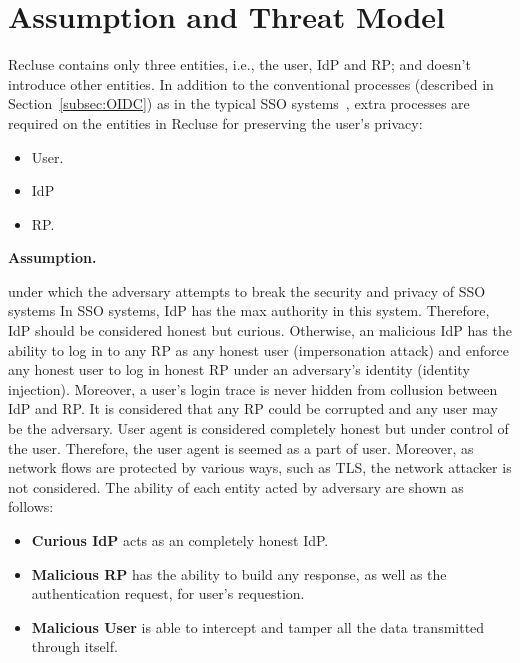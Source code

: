 \section{Assumption and Threat Model}
\label{sec:assumptionandthreatmodel}
Recluse contains only three entities, i.e., the user, IdP and RP; and doesn't introduce other entities. In addition to the conventional processes (described in Section~\ref{subsec:OIDC}) as in the typical SSO systems~\cite{SAMLIdentifier,OpenIDConnect}, extra processes are required on the entities in Recluse for preserving the user's privacy:
\begin{itemize}
  \item User.
  \item IdP
  \item RP. 
\end{itemize}

\noindent\textbf{Assumption.}

under which the adversary attempts to break the security and privacy of SSO systems
In SSO systems, IdP has the max authority in this system. Therefore, IdP should be considered honest but curious. Otherwise, an malicious IdP has the ability to log in to any RP as any honest user (impersonation attack) and enforce any honest user to log in honest RP under an adversary's identity (identity injection). Moreover, a user's login trace is never hidden from collusion between IdP and RP. It is considered that any RP could be corrupted and any user may be the adversary. User agent is considered completely honest but under control of the user. Therefore, the user agent is seemed as a part of user. Moreover, as network flows are protected by various ways, such as TLS, the network attacker is not considered. The ability of each entity acted by adversary are shown as follows:
\begin{itemize}
\item \textbf{Curious IdP} acts as an completely honest IdP.
\item \textbf{Malicious RP} has the ability to build any response, as well as the authentication request, for user's requestion.
\item \textbf{Malicious User} is able to intercept and tamper all the data transmitted through itself.
\end{itemize}


